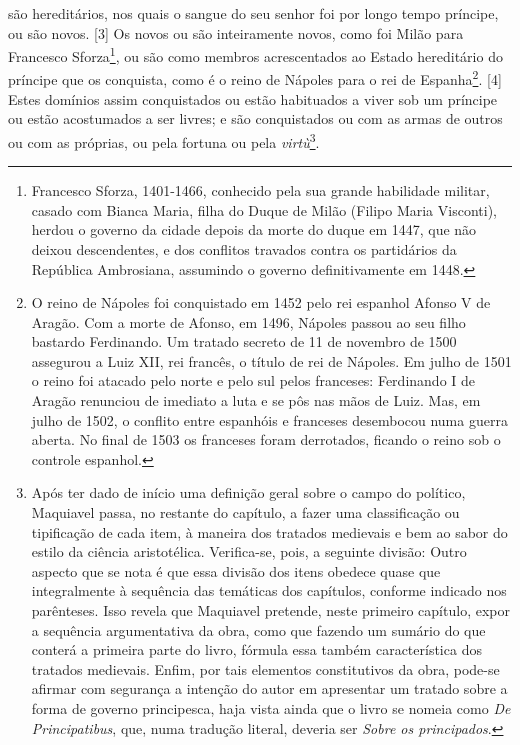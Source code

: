 são hereditários, nos quais o sangue do seu senhor foi por longo tempo
príncipe, ou são novos. {[}3{]} Os novos ou são inteiramente novos, como
foi Milão para Francesco Sforza\footnote{Francesco Sforza, 1401-1466,
  conhecido pela sua grande habilidade militar, casado com Bianca Maria,
  filha do Duque de Milão (Filipo Maria Visconti), herdou o governo da
  cidade depois da morte do duque em 1447, que não deixou descendentes,
  e dos conflitos travados contra os partidários da República
  Ambrosiana, assumindo o governo definitivamente em 1448.}, ou são como
membros acrescentados ao Estado hereditário do príncipe que os
conquista, como é o reino de Nápoles para o rei de Espanha\footnote{O
  reino de Nápoles foi conquistado em 1452 pelo rei espanhol Afonso V de
  Aragão. Com a morte de Afonso, em 1496, Nápoles passou ao seu filho
  bastardo Ferdinando. Um tratado secreto de 11 de novembro de 1500
  assegurou a Luiz XII, rei francês, o título de rei de Nápoles. Em
  julho de 1501 o reino foi atacado pelo norte e pelo sul pelos
  franceses: Ferdinando I de Aragão renunciou de imediato a luta e se
  pôs nas mãos de Luiz. Mas, em julho de 1502, o conflito entre
  espanhóis e franceses desembocou numa guerra aberta. No final de 1503
  os franceses foram derrotados, ficando o reino sob o controle
  espanhol.}. {[}4{]} Estes domínios assim conquistados ou estão
habituados a viver sob um príncipe ou estão acostumados a ser livres; e
são conquistados ou com as armas de outros ou com as próprias, ou pela
fortuna ou pela \emph{virtù}\footnote{Após ter dado de início uma
  definição geral sobre o campo do político, Maquiavel passa, no
  restante do capítulo, a fazer uma classificação ou tipificação de cada
  item, à maneira dos tratados medievais e bem ao sabor do estilo da
  ciência aristotélica. Verifica-se, pois, a seguinte divisão:
 Outro aspecto que se nota é que essa divisão dos itens obedece quase
  que integralmente à sequência das temáticas dos capítulos, conforme
  indicado nos parênteses. Isso revela que Maquiavel pretende, neste
  primeiro capítulo, expor a sequência argumentativa da obra, como que
  fazendo um sumário do que conterá a primeira parte do livro, fórmula
  essa também característica dos tratados medievais. Enfim, por tais
  elementos constitutivos da obra, pode-se afirmar com segurança a
  intenção do autor em apresentar um tratado sobre a forma de governo
  principesca, haja vista ainda que o livro se nomeia como \emph{De
  Principatibus}, que, numa tradução literal, deveria ser \emph{Sobre os
  principados}.}.
